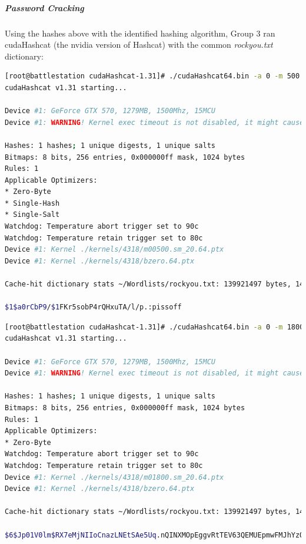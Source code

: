 \lstset{extendedchars=\true}
\lstset{inputencoding=ansinew}
\subparagraph{Password Cracking}
Using the hashes above with the identified hashing algorithm, Group 3 ran cudaHashcat (the nvidia version of Hashcat) with the common \textit{rockyou.txt} dictionary:

\begin{lstlisting}[language=bash,caption={Cracking Jane}]
[root@battlestation cudaHashcat-1.31]# ./cudaHashcat64.bin -a 0 -m 500 ~/jane.wtf ~/Wordlists/rockyou.txt 
cudaHashcat v1.31 starting...

Device #1: GeForce GTX 570, 1279MB, 1500Mhz, 15MCU
Device #1: WARNING! Kernel exec timeout is not disabled, it might cause you errors of code 702

Hashes: 1 hashes; 1 unique digests, 1 unique salts
Bitmaps: 8 bits, 256 entries, 0x000000ff mask, 1024 bytes
Rules: 1
Applicable Optimizers:
* Zero-Byte
* Single-Hash
* Single-Salt
Watchdog: Temperature abort trigger set to 90c
Watchdog: Temperature retain trigger set to 80c
Device #1: Kernel ./kernels/4318/m00500.sm_20.64.ptx
Device #1: Kernel ./kernels/4318/bzero.64.ptx

Cache-hit dictionary stats ~/Wordlists/rockyou.txt: 139921497 bytes, 14343296 words, 14343296 keyspace

$1$a0rCbP9/$1FKr5sobP4rQHxuTA/l/p.:pissoff
\end{lstlisting}


\begin{lstlisting}[language=bash,caption={Cracking User}]
[root@battlestation cudaHashcat-1.31]# ./cudaHashcat64.bin -a 0 -m 1800 ~/user.wtf ~/Wordlists/rockyou.txt 
cudaHashcat v1.31 starting...

Device #1: GeForce GTX 570, 1279MB, 1500Mhz, 15MCU
Device #1: WARNING! Kernel exec timeout is not disabled, it might cause you errors of code 702

Hashes: 1 hashes; 1 unique digests, 1 unique salts
Bitmaps: 8 bits, 256 entries, 0x000000ff mask, 1024 bytes
Rules: 1
Applicable Optimizers:
* Zero-Byte
Watchdog: Temperature abort trigger set to 90c
Watchdog: Temperature retain trigger set to 80c
Device #1: Kernel ./kernels/4318/m01800.sm_20.64.ptx
Device #1: Kernel ./kernels/4318/bzero.64.ptx

Cache-hit dictionary stats ~/Wordlists/rockyou.txt: 139921497 bytes, 14343296 words, 14343296 keyspace

$6$Jp01V0lm$RX7eMjNIIoCnazLNEtSAe5Uq.nQINXMOpEggvRtTEV63QEMUEpmwFMJhYzQtLT/M33Kbl5Mhr59tPJbvN/u4k1:summer
\end{lstlisting}


